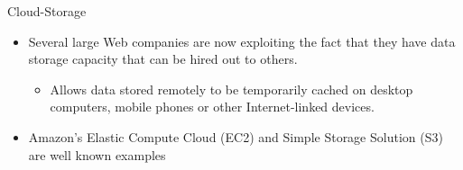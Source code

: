 \documentclass{SKP-beamer}
\begin{document}
\begin{frame}{Cloud-Storage}
	\begin{itemize}
		
		\item  Several large Web companies are now exploiting the fact that they have data
		storage capacity that can be hired out to others.
		\begin{itemize}
			\item  Allows data stored remotely to be temporarily cached on 
			desktop computers, mobile phones or other 
			Internet-linked devices.
		\end{itemize}
		\item  Amazon’s Elastic Compute Cloud (EC2) and Simple Storage Solution (S3) are well
		known examples
	\end{itemize}
\end{frame}
\end{document}
